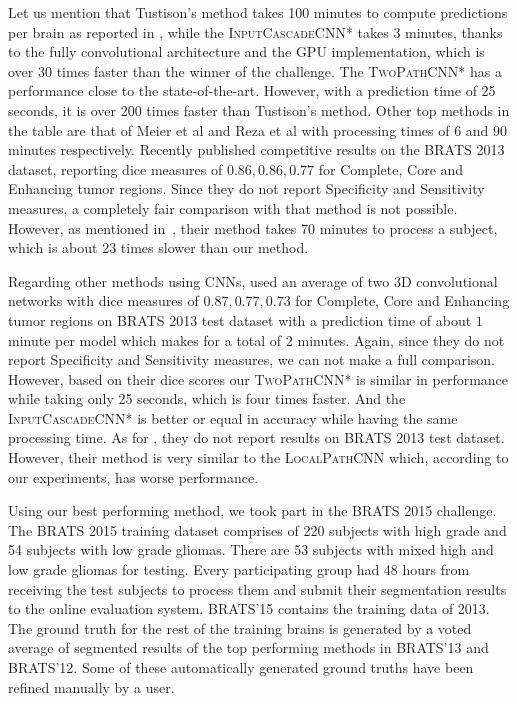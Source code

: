 \documentclass[final,5p,times,twocolumn]{elsarticle}
\begin{document}
{Let us mention that Tustison's method takes 100 minutes  to compute predictions per brain as reported in \citep{Menze2014}, while the \textsc{InputCascadeCNN*} takes 3 minutes, thanks to the fully convolutional architecture and the GPU implementation, which is over 30 times faster than the winner of the challenge. The \textsc{TwoPathCNN*}  has a performance close to the state-of-the-art. However, with a prediction time of 25 seconds, it is over 200 times faster than Tustison's method. Other top methods in the table are that of Meier et al and Reza et al with processing times of 6 and 90 minutes respectively. Recently \citet{Subbanna2014} published competitive results on the BRATS 2013 dataset, reporting dice measures of $0.86, 0.86, 0.77$ for Complete, Core and Enhancing tumor regions. Since they do not report Specificity and Sensitivity measures, a completely fair comparison with that method is not possible. However, as mentioned in~\citep{Subbanna2014}, their method takes 70 minutes to process a subject, which is about 23 times slower than our method. 

Regarding other methods using CNNs, \citet{Urban2014} used an average of two 3D convolutional networks with dice measures of $0.87, 0.77, 0.73$ for Complete, Core and Enhancing tumor regions on BRATS 2013 test dataset with a prediction time of about $1$ minute per model which makes for a total of $2$ minutes. Again, since they do not report Specificity and Sensitivity measures, we can not make a full comparison. However, based on their dice scores our \textsc{TwoPathCNN*} is similar in performance while taking only 25 seconds, which is four times faster. And the \textsc{InputCascadeCNN*} is better or equal in accuracy while having the same processing time. As for \citep{Zikic2014}, they do not report results on BRATS 2013 test dataset. However, their method is very similar to the \textsc{LocalPathCNN} which, according to our experiments, has worse performance.  

Using our best performing method, we took part in the BRATS 2015 challenge. The BRATS 2015 training dataset comprises of 220 subjects with high grade and 54 subjects with low grade gliomas. There are 53 subjects with mixed high and low grade gliomas for testing. Every participating group had 48 hours from receiving the test subjects to process them and submit their segmentation results to the online evaluation system. BRATS'15 contains the training data of 2013. The ground truth for the rest of the training brains is generated by a voted average of segmented results of the top performing methods in BRATS'13 and BRATS'12. Some of these automatically generated ground truths have been refined manually by a user. 

}
\end{document}
